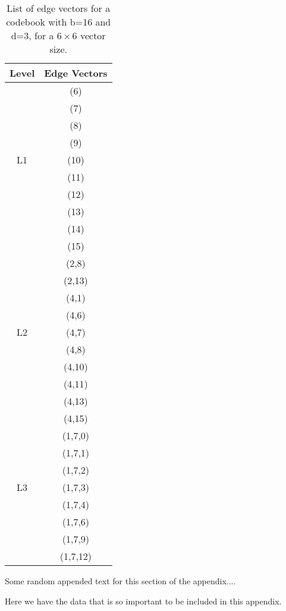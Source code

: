 \begin{table}[!t]
  \renewcommand{\arraystretch}{1.3}
  \centering

  \caption{ List of edge vectors for a codebook with b=16 and d=3, for
    a $6 \times 6$ vector size.}
  \label{table5}

  \begin{tabular}{|c|c|} \hline
    Level & Edge Vectors \\ \hline

    & (6)\\
    & (7)\\
    & (8)\\
    & (9)\\
    L1 & (10)\\
    & (11)\\
    & (12)\\
    & (13)\\
    & (14)\\
    & (15) \\ \hline

    & (2,8)\\
    & (2,13)\\
    & (4,1)\\
    & (4,6)\\
    L2 & (4,7)\\
    & (4,8)\\
    & (4,10)\\
    & (4,11)\\
    & (4,13)\\
    & (4,15) \\ \hline

    & (1,7,0)\\
    & (1,7,1)\\
    & (1,7,2)\\
    L3 & (1,7,3)\\
    & (1,7,4)\\
    & (1,7,6)\\
    & (1,7,9)\\
    & (1,7,12) \\ \hline

  \end{tabular}

\end{table}



\label{sec:back}


Some random appended text for this section of the appendix....


\label{sec:meat}

Here we have the data that is so important to be included in this
appendix.
